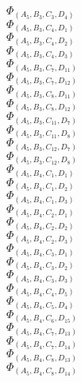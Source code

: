 \documentclass[14pt]{article}
\begin{document}
    $\Phi_{({A}_{5}, {B}_{3}, {C}_{3}, {D}_{4})}$ \\ 
    $\Phi_{({A}_{5}, {B}_{3}, {C}_{4}, {D}_{1})}$ \\ 
    $\Phi_{({A}_{5}, {B}_{3}, {C}_{4}, {D}_{2})}$ \\ 
    $\Phi_{({A}_{5}, {B}_{3}, {C}_{4}, {D}_{3})}$ \\ 
    $\Phi_{({A}_{5}, {B}_{3}, {C}_{7}, {D}_{11})}$ \\ 
    $\Phi_{({A}_{5}, {B}_{3}, {C}_{7}, {D}_{12})}$ \\ 
    $\Phi_{({A}_{5}, {B}_{3}, {C}_{8}, {D}_{11})}$ \\ 
    $\Phi_{({A}_{5}, {B}_{3}, {C}_{8}, {D}_{12})}$ \\ 
    $\Phi_{({A}_{5}, {B}_{3}, {C}_{11}, {D}_{7})}$ \\ 
    $\Phi_{({A}_{5}, {B}_{3}, {C}_{11}, {D}_{8})}$ \\ 
    $\Phi_{({A}_{5}, {B}_{3}, {C}_{12}, {D}_{7})}$ \\ 
    $\Phi_{({A}_{5}, {B}_{3}, {C}_{12}, {D}_{8})}$ \\ 
    $\Phi_{({A}_{5}, {B}_{4}, {C}_{1}, {D}_{1})}$ \\ 
    $\Phi_{({A}_{5}, {B}_{4}, {C}_{1}, {D}_{2})}$ \\ 
    $\Phi_{({A}_{5}, {B}_{4}, {C}_{1}, {D}_{3})}$ \\ 
    $\Phi_{({A}_{5}, {B}_{4}, {C}_{2}, {D}_{1})}$ \\ 
    $\Phi_{({A}_{5}, {B}_{4}, {C}_{2}, {D}_{2})}$ \\ 
    $\Phi_{({A}_{5}, {B}_{4}, {C}_{2}, {D}_{3})}$ \\ 
    $\Phi_{({A}_{5}, {B}_{4}, {C}_{3}, {D}_{1})}$ \\ 
    $\Phi_{({A}_{5}, {B}_{4}, {C}_{3}, {D}_{2})}$ \\ 
    $\Phi_{({A}_{5}, {B}_{4}, {C}_{3}, {D}_{3})}$ \\ 
    $\Phi_{({A}_{5}, {B}_{4}, {C}_{4}, {D}_{5})}$ \\ 
    $\Phi_{({A}_{5}, {B}_{4}, {C}_{5}, {D}_{4})}$ \\ 
    $\Phi_{({A}_{5}, {B}_{4}, {C}_{6}, {D}_{15})}$ \\ 
    $\Phi_{({A}_{5}, {B}_{4}, {C}_{7}, {D}_{13})}$ \\ 
    $\Phi_{({A}_{5}, {B}_{4}, {C}_{7}, {D}_{14})}$ \\ 
    $\Phi_{({A}_{5}, {B}_{4}, {C}_{8}, {D}_{13})}$ \\ 
    $\Phi_{({A}_{5}, {B}_{4}, {C}_{8}, {D}_{14})}$ \\ 
\end{document}
